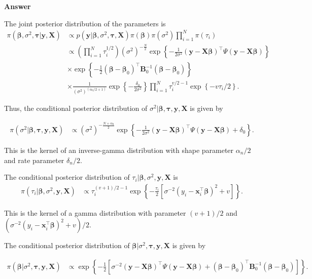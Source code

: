 \begin{enumerate}[leftmargin=*]
\textbf{Answer}

The joint posterior distribution of the parameters is
\begin{align*}
	\pi(\bm{\beta}, \sigma^2, \bm{\tau}|\bm{y}, {\bm{X}}) & \propto p({\bm{y}}|\bm{\beta}, \sigma^2, \bm{\tau}, {\bm{X}}) \pi(\bm{\beta}) \pi(\sigma^2) \prod_{i=1}^N \pi(\tau_i) \\
	&\propto \left(\prod_{i=1}^N \tau_i^{1/2}\right)(\sigma^2)^{-\frac{N}{2}}\exp\left\{-\frac{1}{2\sigma^2}({\bm{y}}-{\bm{X}}\bm{\beta})^{\top}\Psi({\bm{y}}-{\bm{X}}\bm{\beta})\right\}\\
	&\times \exp\left\{-\frac{1}{2}(\bm{\beta} - \bm{\beta}_0)^{\top}\bm{B}_0^{-1}(\bm{\beta} - \bm{\beta}_0)\right\}\\
	&\times\frac{1}{(\sigma^2)^{(\alpha_0/2+1)}}\exp\left\{-\frac{\delta_0}{2\sigma^2}\right\}\prod_{i=1}^N \tau_i^{v/2-1}\exp\left\{-v\tau_i/2\right\}.
\end{align*}

Thus, the conditional posterior distribution of $\sigma^2|\bm{\beta}, \bm{\tau}, \bm{y}, {\bm{X}}$ is given by

\begin{align*}
	\pi(\sigma^2|\bm{\beta}, \bm{\tau}, \bm{y}, {\bm{X}}) & \propto (\sigma^2)^{-\frac{N+\alpha_0}{2}}\exp\left\{-\frac{1}{2\sigma^2}({\bm{y}}-{\bm{X}}\bm{\beta})^{\top}\Psi({\bm{y}}-{\bm{X}}\bm{\beta})+\delta_0\right\}.
\end{align*}

This is the kernel of an inverse-gamma distribution with shape parameter $\alpha_n/2$ and rate parameter $\delta_n/2$.

The conditional posterior distribution of $\tau_i|\bm{\beta}, \sigma^2, \bm{y}, {\bm{X}}$ is
\begin{align*}
	\pi(\tau_i|\bm{\beta}, \sigma^2,\bm{y}, {\bm{X}}) & \propto
	\tau_i^{(v+1)/2-1}\exp\left\{-\frac{\tau_i}{2}[\sigma^{-2}(y_i-{\bm{x}}_i^{\top}\bm{\beta})^2+v]\right\}.
\end{align*}

This is the kernel of a gamma distribution with parameter $(v+1)/2$ and $(\sigma^{-2}(y_i-{\bm{x}}_i^{\top}\bm{\beta})^2+v)/2$. 

The conditional posterior distribution of $\bm{\beta}|\sigma^2, \bm{\tau}, \bm{y}, {\bm{X}}$ is given by

\begin{align*}
	\pi(\bm{\beta}| \sigma^2, \bm{\tau}, \bm{y}, {\bm{X}}) & \propto \exp\left\{-\frac{1}{2}[\sigma^{-2}({\bm{y}}-{\bm{X}}\bm{\beta})^{\top}\Psi({\bm{y}}-{\bm{X}}\bm{\beta})+(\bm{\beta} - \bm{\beta}_0)^{\top}\bm{B}_0^{-1}(\bm{\beta} - \bm{\beta}_0)]\right\}.
\end{align*} 


\end{enumerate}
